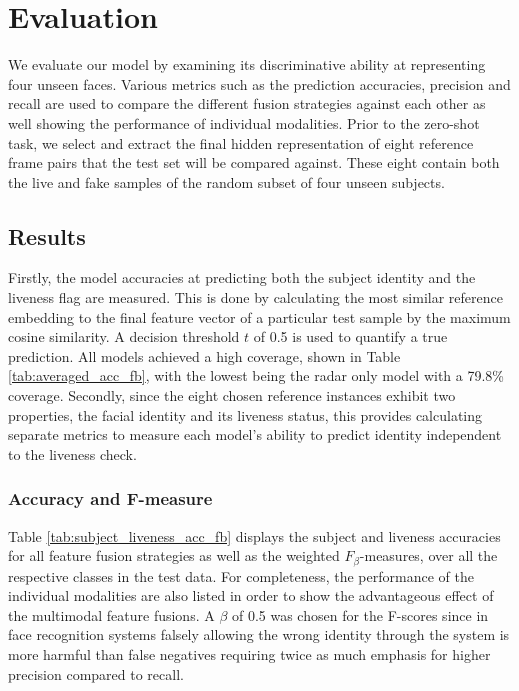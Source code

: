 \documentclass{mpaper}
\begin{document}
\section{Evaluation}
We evaluate our model by examining its discriminative ability at representing four unseen faces. Various metrics such as the prediction accuracies, precision and recall are used to compare the different fusion strategies against each other as well showing the performance of individual modalities. Prior to the zero-shot task, we select and extract the final hidden representation of eight reference frame pairs that the test set will be compared against. These eight contain both the live and fake samples of the random subset of four unseen subjects.

\subsection{Results}
Firstly, the model accuracies at predicting both the subject identity and the liveness flag are measured. This is done by calculating the most similar reference embedding to the final feature vector of a particular test sample by the maximum cosine similarity. A decision threshold $t$ of 0.5 is used to quantify a true prediction. All models achieved a high coverage, shown in Table \ref{tab:averaged_acc_fb}, with the lowest being the radar only model with a 79.8\% coverage. Secondly, since the eight chosen reference instances exhibit two properties, the facial identity and its liveness status, this provides calculating separate metrics to measure each model's ability to predict identity independent to the liveness check.

\subsubsection{Accuracy and F-measure}
Table \ref{tab:subject_liveness_acc_fb} displays the subject and liveness accuracies for all feature fusion strategies as well as the weighted $F_{\beta}$-measures, over all the respective classes in the test data. For completeness, the performance of the individual modalities are also listed in order to show the advantageous effect of the multimodal feature fusions. A $\beta$ of 0.5 was chosen for the F-scores since in face recognition systems falsely allowing the wrong identity through the system is more harmful than false negatives requiring twice as much emphasis for higher precision compared to recall. 
\end{document}
